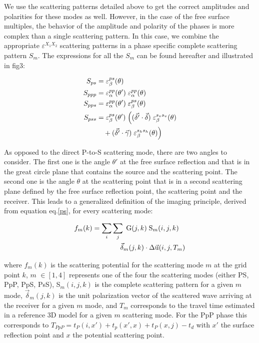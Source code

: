 \documentclass[10pt,a4paper]{article}
\numberwithin{equation}{section}
\begin{document}
We use the scattering patterns detailed above to get the correct amplitudes and polarities for these modes as well.
However, in the case of the free surface multiples, the behavior of the amplitude and polarity of the phases is more complex than a single scattering pattern.
In this case, we combine the appropriate $\varepsilon^{X_1X_2}$ scattering patterns in a phase specific complete scattering pattern $S_m$.
The expressions for all the $S_m$ can be found hereafter and illustrated in fig3:

\begin{align}
S_{ps}  &= \varepsilon^{ps}_{\beta} (\theta )
\\
S_{ppp} &= \varepsilon^{pp}_{\alpha} (\theta') \; \varepsilon^{pp}_{\alpha} (\theta)
\\
S_{pps} &= \varepsilon^{pp}_{\alpha} (\theta') \; \varepsilon^{ps}_{\beta} (\theta)
\\
S_{pss} &= \varepsilon^{ps}_{\beta} (\theta') \; \Big( (\vec{\delta'} \cdot \vec{\delta}) \; \varepsilon^{s_vs_v}_{\beta} (\theta)
      \notag \\ & \quad + (\vec{\delta'} \cdot \vec{\gamma}) \; \varepsilon^{s_hs_h}_{\beta} (\theta) \Big)
\end{align}
\vspace{1mm}

As opposed to the direct P-to-S scattering mode, there are two angles to consider.
The first one is the angle $\theta'$ at the free surface reflection and that is in the great circle plane that contains the source and the scattering point.
The second one is the angle $\theta$ at the scattering point that is in a second scattering plane defined by the free surface reflection point, the scattering point and the receiver.
This leads to a generalized definition of the imaging principle, derived from equation eq.\eqref{ps}, for every scattering mode:

\begin{align}
  f_{m}(k) &= \sum_i \sum_j \; \text{G}(j,k) \; \text{S}_{m}(i,j,k) \; \notag\\&\qquad\qquad \vec{\delta}_{m}(j,k) \cdot \Delta\vec{\text{u}}(i,j,T_m)
  \label{mod}
\end{align}
\vspace{1mm}

\noindent where $f_{m}(k)$ is the scattering potential for the scattering mode $m$ at the grid point $k$, 
$m$ $\in [1,4]$ represents one of the four the scattering modes (either PS, PpP, PpS, PsS), 
S$_m(i,j,k)$ is the complete scattering pattern for a given $m$ mode, 
$\vec{\delta}_m(j,k)$ is the unit polarization vector of the scattered wave arriving at the receiver for a given $m$ mode, 
and $T_m$ corresponds to the travel time estimated in a reference 3D model  for a given $m$ scattering mode.
For the PpP phase this corresponds to $T_{PpP} = t_P(i,x') + t_p(x',x) + t_P(x,j) - t_d$ with $x'$ the surface reflection point and $x$ the potential scattering point.
\end{document}
